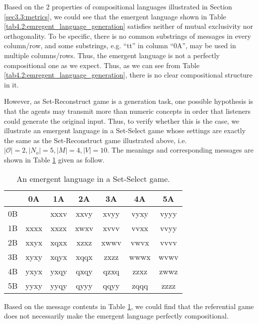 Based on the 2 properties of compositional languages illustrated in Section \ref{sec3.3:metrics}, we could see that the emergent language shown in Table \ref{tab4.2:emregent_language_generation} satisfies neither of mutual exclusivity nor orthogonality. To be specific, there is no common substrings of messages in every column/row, and some substrings, e.g. ``tt'' in column ``0A'', may be used in multiple columns/rows. Thus, the emergent language is not a perfectly compositional one as we expect. Thus, as we can see from Table \ref{tab4.2:emregent_language_generation}, there is no clear compositional structure in it. 

However, as Set-Reconstruct game is a generation task, one possible hypothesis is that the agents may transmit more than numeric concepts in order that listeners could generate the original input. Thus, to verify whether this is the case, we illustrate an emergent language in a Set-Select game whose settings are exactly the same as the Set-Reconstruct game illustrated above, i.e. $|\mathcal{O}|=2, |N_o|=5, |M|=4, |V|=10$. The meanings and corresponding messages are shown in Table \ref{tab4.3:emregent_language_referential} given as follow.

\begin{table}[!h]
    \centering
    \begin{tabular}{|c|c|c|c|c|c|c|}
        \hline
           & 0A   & 1A   & 2A   & 3A   & 4A   & 5A   \\ \hline
        0B &      & xxxv & xxvy & xvyy & vyxy & vyyy \\ \hline
        1B & xxxx & xxzx & xwxv & xvvv & vvxx & vvyy \\ \hline
        2B & xxyx & xqxx & xzxz & xwwv & vwvx & vvvv \\ \hline
        3B & xyxy & xqyx & xqqx & zxzz & wwwx & wvwv \\ \hline
        4B & yxyx & yxqy & qxqy & qzxq & zzxz & zwwz \\ \hline
        5B & yyxy & yyqy & qyyy & qqyy & zqqq & zzzz \\ \hline
        \end{tabular}
    \caption{An emergent language in a Set-Select game.}
    \label{tab4.3:emregent_language_referential}
\end{table}

Based on the message contents in Table \ref{tab4.3:emregent_language_referential}, we could find that the referential game does not necessarily make the emergent language perfectly compositional. 

